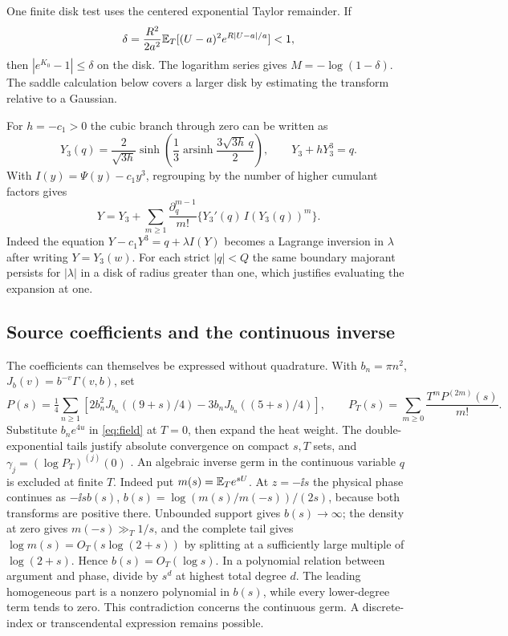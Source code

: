 One finite disk test uses the centered exponential Taylor remainder. If
\[
 \delta=\frac{R^2}{2a^2}\mathbb E_T[(U-a)^2e^{R|U-a|/a}]<1,
\]
then \(|e^{K_0}-1|\le\delta\) on the disk. The logarithm series gives
\(M=-\log(1-\delta)\). The saddle calculation below covers a larger disk by estimating the transform relative to a Gaussian.

For \(h=-c_1>0\) the cubic branch through zero can be written as
\[
 Y_3(q)=\frac{2}{\sqrt{3h}}\sinh\!\left(\frac13\operatorname{arsinh}
                          \frac{3\sqrt{3h}\,q}{2}\right),\qquad Y_3+hY_3^3=q .
\]
With \(I(y)=\Psi(y)-c_1y^3\), regrouping by the number of higher cumulant
factors gives
\[
 Y=Y_3+\sum_{m\ge1}\frac{\partial_q^{m-1}}{m!}
                \{Y_3'(q)\,I(Y_3(q))^m\}.
\]
Indeed the equation \(Y-c_1Y^3=q+\lambda I(Y)\) becomes a Lagrange
inversion in \(\lambda\) after writing \(Y=Y_3(w)\). For each strict
\(|q|<Q\) the same boundary majorant persists for \(|\lambda|\) in a disk
of radius greater than one, which justifies evaluating the expansion at one.

\subsection{Source coefficients and the continuous inverse}
The coefficients can themselves be expressed without quadrature. With \(b_n=\pi n^2\), \(J_b(v)=b^{-v}\Gamma(v,b)\), set
\[
 P(s)=\tfrac14\sum_{n\ge1}\!\left[2b_n^2J_{b_n}((9+s)/4)
               -3b_nJ_{b_n}((5+s)/4)\right],\qquad
 P_T(s)=\sum_{m\ge0}\frac{T^m P^{(2m)}(s)}{m!}.
\]
Substitute \(b_ne^{4u}\) in \eqref{eq:field} at \(T=0\), then expand the heat weight. The double-exponential tails justify absolute convergence on compact \(s,T\) sets, and \(\gamma_j=(\log P_T)^{(j)}(0)\) \cite[8.2.2]{DLMF}. An algebraic inverse germ in the continuous variable \(q\) is excluded at finite \(T\). Indeed put \(m(s)=\mathbb E_Te^{sU}\). At \(z=-\ii s\) the physical phase continues as \(-\ii s b(s)\), \(b(s)=\log(m(s)/m(-s))/(2s)\), because both transforms are positive there. Unbounded support gives \(b(s)\to\infty\); the density at zero gives \(m(-s)\gg_T1/s\), and the complete tail gives \(\log m(s)=O_T(s\log(2+s))\) by splitting at a sufficiently large multiple of \(\log(2+s)\). Hence \(b(s)=O_T(\log s)\). In a polynomial relation between argument and phase, divide by \(s^d\) at highest total degree \(d\). The leading homogeneous part is a nonzero polynomial in \(b(s)\), while every lower-degree term tends to zero. This contradiction concerns the continuous germ. A discrete-index or transcendental expression remains possible.


